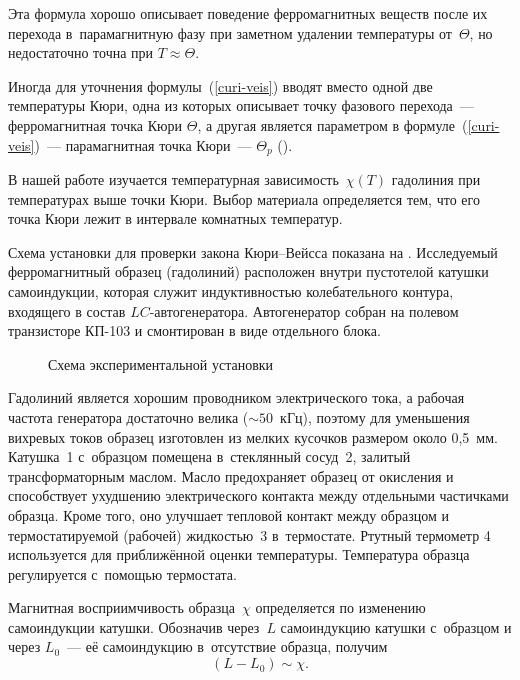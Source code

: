 Эта формула хорошо описывает поведение ферромагнитных веществ после их перехода в~парамагнитную фазу при заметном
удалении температуры от~$\Theta$, но недостаточно точна при $T\approx \Theta$.

Иногда для уточнения формулы~(\eqref{curi-veis}) вводят вместо одной две температуры Кюри, одна из которых описывает точку фазового
перехода~--- ферромагнитная точка Кюри $\Theta$, а другая является параметром в формуле~(\eqref{curi-veis})~--- парамагнитная точка
Кюри~--- $\Theta_p$ ().

В нашей работе изучается температурная зависимость~$\chi(T)$ гадолиния при температурах выше точки Кюри. Выбор материала
определяется тем, что его точка Кюри лежит в интервале комнатных температур.

\experiment

Схема установки для проверки закона Кюри--Вейсса показана на . Исследуемый ферромагнитный образец (гадолиний)
расположен внутри пустотелой катушки самоиндукции, которая служит индуктивностью колебательного контура, входящего в
состав $LC$-автогенератора. Автогенератор собран на полевом транзисторе КП-103 и смонтирован в виде отдельного блока.

\begin{figure}
	\caption{Схема экспериментальной установки}
\end{figure}

Гадолиний является хорошим проводником электрического тока, а рабочая частота генератора достаточно велика
(${\sim}50$~кГц), поэтому для уменьшения вихревых токов образец изготовлен из мелких кусочков размером около 0,5~мм.
Катушка~1 с~образцом помещена в~стеклянный сосуд~2, залитый трансформаторным маслом. Масло предохраняет образец от
окисления и способствует ухудшению электрического контакта между отдельными частичками образца. Кроме того, оно улучшает
тепловой контакт между образцом и термостатируемой (рабочей) жидкостью~3 в~термостате. Ртутный термометр 4 используется
для приближённой оценки температуры. Температура образца регулируется с~помощью термостата.%

Магнитная восприимчивость образца~$\chi$ определяется по изменению самоиндукции катушки. Обозначив через~$L$
самоиндукцию катушки с~образцом и через $L_0$~--- её самоиндукцию в~отсутствие образца, получим
\begin{equation}%
	(L-L_0)\sim\chi.
\end{equation}

